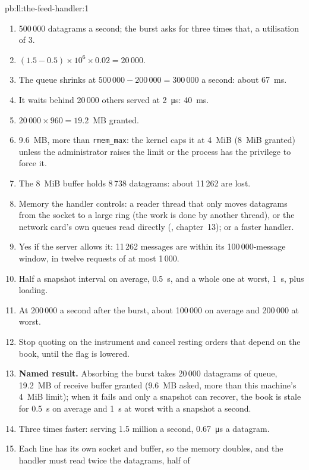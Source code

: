 \begin{solution}{pb:ll:the-feed-handler:1}
\begin{enumerate}
\item 500\,000 datagrams a second; the burst asks for three times that, a utilisation of 3.
\item $(1.5 - 0.5) \times 10^6 \times 0.02 = 20\,000$.
\item The queue shrinks at $500\,000 - 200\,000 = 300\,000$ a second: about \qty{67}{\milli\second}.
\item It waits behind 20\,000 others served at \qty{2}{\micro\second}: \qty{40}{\milli\second}.
\item $20\,000 \times 960 = 19.2$~MB granted.
\item 9.6~MB, more than \texttt{rmem\_max}: the kernel caps it at 4~MiB (8~MiB granted) unless the administrator raises the
limit or the process has the privilege to force it.
\item The 8~MiB buffer holds 8\,738 datagrams: about 11\,262 are lost.
\item Memory the handler controls: a reader thread that only moves datagrams from the socket to a large ring (the work is done
by another thread), or the network card's own queues read directly (, chapter~13); or a faster handler.
\item Yes if the server allows it: 11\,262 messages are within its 100\,000-message window, in twelve requests of at most 1\,000.
\item Half a snapshot interval on average, \qty{0.5}{\second}, and a whole one at worst, \qty{1}{\second}, plus loading.
\item At 200\,000 a second after the burst, about 100\,000 on average and 200\,000 at worst.
\item Stop quoting on the instrument and cancel resting orders that depend on the book, until the flag is lowered.
\item \textbf{Named result.} Absorbing the burst takes 20\,000 datagrams of queue, 19.2~MB of receive buffer granted (9.6~MB
asked, more than this machine's 4~MiB limit); when it fails and only a snapshot can recover, the book is stale for
\qty{0.5}{\second} on average and \qty{1}{\second} at worst with a snapshot a second.
\item Three times faster: serving 1.5 million a second, \qty{0.67}{\micro\second} a datagram.
\item Each line has its own socket and buffer, so the memory doubles, and the handler must read twice the datagrams, half of

\end{enumerate}
\end{solution}
